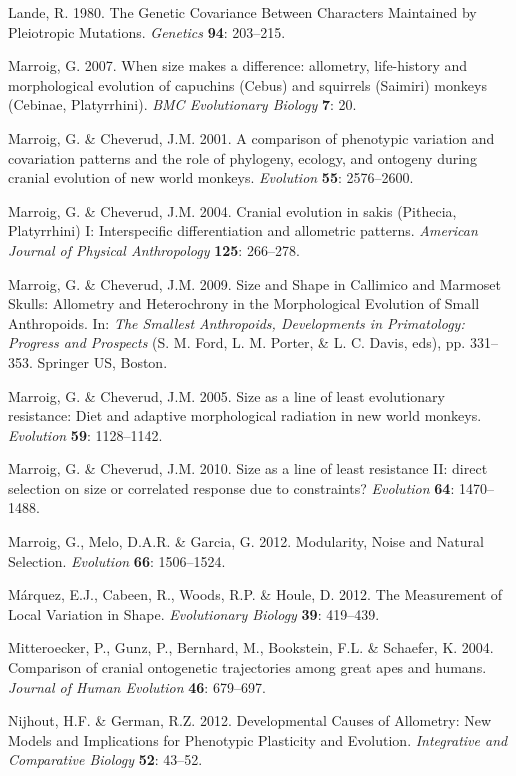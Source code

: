 \documentclass[12pt,]{article}
\begin{document}
Lande, R. 1980. The Genetic Covariance Between Characters Maintained by
Pleiotropic Mutations. \emph{Genetics} \textbf{94}: 203--215.

Marroig, G. 2007. When size makes a difference: allometry, life-history
and morphological evolution of capuchins (Cebus) and squirrels (Saimiri)
monkeys (Cebinae, Platyrrhini). \emph{BMC Evolutionary Biology}
\textbf{7}: 20.

Marroig, G. \& Cheverud, J.M. 2001. A comparison of phenotypic variation
and covariation patterns and the role of phylogeny, ecology, and
ontogeny during cranial evolution of new world monkeys. \emph{Evolution}
\textbf{55}: 2576--2600.

Marroig, G. \& Cheverud, J.M. 2004. Cranial evolution in sakis
(Pithecia, Platyrrhini) I: Interspecific differentiation and allometric
patterns. \emph{American Journal of Physical Anthropology} \textbf{125}:
266--278.

Marroig, G. \& Cheverud, J.M. 2009. Size and Shape in Callimico and
Marmoset Skulls: Allometry and Heterochrony in the Morphological
Evolution of Small Anthropoids. In: \emph{The Smallest Anthropoids,
Developments in Primatology: Progress and Prospects} (S. M. Ford, L. M.
Porter, \& L. C. Davis, eds), pp. 331--353. Springer US, Boston.

Marroig, G. \& Cheverud, J.M. 2005. Size as a line of least evolutionary
resistance: Diet and adaptive morphological radiation in new world
monkeys. \emph{Evolution} \textbf{59}: 1128--1142.

Marroig, G. \& Cheverud, J.M. 2010. Size as a line of least resistance
II: direct selection on size or correlated response due to constraints?
\emph{Evolution} \textbf{64}: 1470--1488.

Marroig, G., Melo, D.A.R. \& Garcia, G. 2012. Modularity, Noise and
Natural Selection. \emph{Evolution} \textbf{66}: 1506--1524.

Márquez, E.J., Cabeen, R., Woods, R.P. \& Houle, D. 2012. The
Measurement of Local Variation in Shape. \emph{Evolutionary Biology}
\textbf{39}: 419--439.

Mitteroecker, P., Gunz, P., Bernhard, M., Bookstein, F.L. \& Schaefer,
K. 2004. Comparison of cranial ontogenetic trajectories among great apes
and humans. \emph{Journal of Human Evolution} \textbf{46}: 679--697.

Nijhout, H.F. \& German, R.Z. 2012. Developmental Causes of Allometry:
New Models and Implications for Phenotypic Plasticity and Evolution.
\emph{Integrative and Comparative Biology} \textbf{52}: 43--52.
\end{document}
